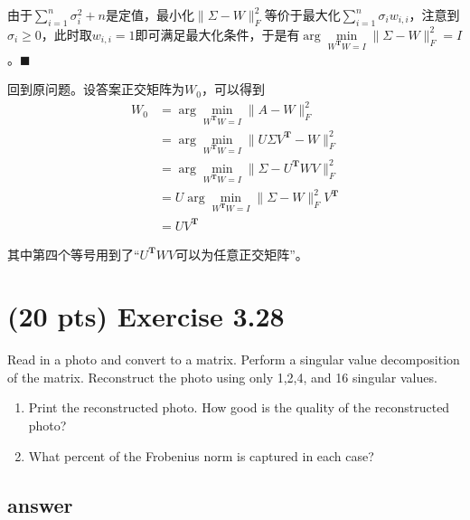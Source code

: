 \documentclass[11pt]{article}
\begin{document}
	由于$\sum\limits_{i=1}^{n}\sigma_i^2+n$是定值，最小化$\|\Sigma - W\|_F^2$等价于最大化$\sum\limits_{i=1}^n\sigma_iw_{i,i}$，注意到$\sigma_i \ge 0$，此时取$w_{i,i} = 1$即可满足最大化条件，于是有$\arg\min\limits_{W^{\mathbf T}W = I}\|\Sigma - W\|_F^2 = I$。\hfill $\blacksquare$

	回到原问题。设答案正交矩阵为$W_0$，可以得到
	\begin{align*}
	W_0 &= \arg\min_{W^{\mathbf T}W = I}\|A - W\|_F^2\\
	&= \arg\min_{W^{\mathbf T}W = I}\|U\Sigma V^{\mathbf T} - W\|_F^2\\
	&= \arg\min_{W^{\mathbf T}W = I}\|\Sigma - U^{\mathbf T}WV\|_F^2\\
	&= U\arg\min_{W^{\mathbf T}W = I}\|\Sigma - W\|_F^2V^{\mathbf T}\\
	&= UV^{\mathbf T}
\end{align*}

其中第四个等号用到了“$U^{\mathbf T}WV$可以为任意正交矩阵”。
  \section{(20 pts) Exercise 3.28}
  Read in a photo and convert to a matrix. Perform a singular value decomposition of the matrix. Reconstruct the photo using only 1,2,4, and 16 singular values.
  \begin{enumerate}
      \item Print the reconstructed photo. How good is the quality of the reconstructed photo?
      \item What percent of the Frobenius norm is captured in each case?
  \end{enumerate}
  \subsection*{answer}

\begin{figure}[htbp]
	\centering
	\quad
	\quad
	\\
\quad
{}
\quad
{}
\end{figure}
\end{document}
